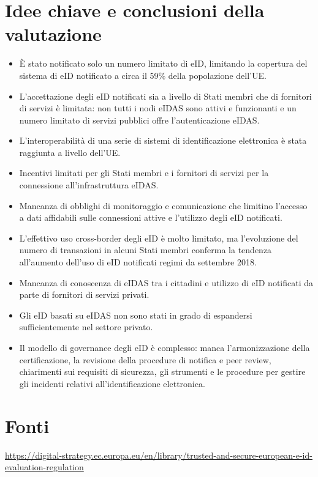 \section{Idee chiave e conclusioni della valutazione}
\begin{itemize}
    \item È stato notificato solo un numero limitato di eID, limitando la copertura del sistema di eID notificato
    a circa il 59\% della popolazione dell'UE.
    \item L'accettazione degli eID notificati sia a livello di Stati membri che di fornitori di servizi è limitata: non tutti i nodi eIDAS sono attivi e funzionanti e un numero limitato di servizi pubblici offre l'autenticazione eIDAS.
    \item L'interoperabilità di una serie di sistemi di identificazione elettronica è stata raggiunta a livello dell'UE.
    \item Incentivi limitati per gli Stati membri e i fornitori di servizi per la connessione all'infrastruttura eIDAS.
    \item Mancanza di obblighi di monitoraggio e comunicazione che limitino l'accesso a dati affidabili sulle connessioni attive e l'utilizzo degli eID notificati.
    \item L'effettivo uso cross-border degli eID è molto limitato, ma l'evoluzione del numero di
    transazioni in alcuni Stati membri conferma la tendenza all'aumento dell'uso di eID notificati
    regimi da settembre 2018.
    \item Mancanza di conoscenza di eIDAS tra i cittadini e utilizzo di eID notificati da parte di fornitori di servizi privati.
    \item Gli eID basati su eIDAS non sono stati in grado di espandersi sufficientemente nel settore privato.
    \item Il modello di governance degli eID è complesso: manca l'armonizzazione della certificazione, la revisione della
    procedure di notifica e peer review, chiarimenti sui requisiti di sicurezza, gli strumenti e le procedure per gestire gli incidenti relativi all'identificazione elettronica.
    
\end{itemize}

\section{Fonti}
\href{https://digital-strategy.ec.europa.eu/en/library/trusted-and-secure-european-e-id-evaluation-regulation}{https://digital-strategy.ec.europa.eu/en/library/trusted-and-secure-european-e-id-evaluation-regulation}